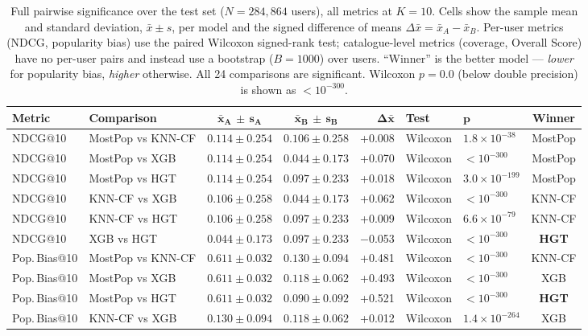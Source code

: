 \documentclass[10pt,twocolumn,letterpaper]{article}
\begin{document}
\begin{table}[h]
\centering\scriptsize
\caption{Full pairwise significance over the test set ($N{=}284{,}864$ users), all
metrics at $K{=}10$. Cells show the sample mean and standard deviation,
$\bar{x}\pm s$, per model and the signed difference of means
$\Delta\bar{x}{=}\bar{x}_A{-}\bar{x}_B$. Per-user metrics (NDCG, popularity bias) use the paired
Wilcoxon signed-rank test; catalogue-level metrics (coverage, Overall Score) have no
per-user pairs and instead use a bootstrap ($B{=}1000$) over users. ``Winner'' is
the better model --- \emph{lower} for popularity bias, \emph{higher} otherwise. All
24 comparisons are significant. Wilcoxon $p{=}0.0$ (below double precision) is shown
as $<\!10^{-300}$.}
\label{tab:significance}
\setlength{\tabcolsep}{4pt}
\renewcommand{\arraystretch}{1.12}
\begin{tabular}{llccrllc}
\toprule
\textbf{Metric} & \textbf{Comparison} & $\boldsymbol{\bar{x}_A\,{\pm}\,s_A}$ & $\boldsymbol{\bar{x}_B\,{\pm}\,s_B}$ & $\boldsymbol{\Delta\bar{x}}$ & \textbf{Test} & $\boldsymbol{p}$ & \textbf{Winner}\\
\midrule
NDCG@10 & MostPop vs KNN-CF & $0.114\pm0.254$ & $0.106\pm0.258$ & +0.008 & Wilcoxon & $1.8{\times}10^{-38}$ & MostPop\\
NDCG@10 & MostPop vs XGB & $0.114\pm0.254$ & $0.044\pm0.173$ & +0.070 & Wilcoxon & $<\!10^{-300}$ & MostPop\\
NDCG@10 & MostPop vs HGT & $0.114\pm0.254$ & $0.097\pm0.233$ & +0.018 & Wilcoxon & $3.0{\times}10^{-199}$ & MostPop\\
NDCG@10 & KNN-CF vs XGB & $0.106\pm0.258$ & $0.044\pm0.173$ & +0.062 & Wilcoxon & $<\!10^{-300}$ & KNN-CF\\
NDCG@10 & KNN-CF vs HGT & $0.106\pm0.258$ & $0.097\pm0.233$ & +0.009 & Wilcoxon & $6.6{\times}10^{-79}$ & KNN-CF\\
NDCG@10 & XGB vs HGT & $0.044\pm0.173$ & $0.097\pm0.233$ & $-$0.053 & Wilcoxon & $<\!10^{-300}$ & \textbf{HGT}\\
\midrule
Pop.\,Bias@10 & MostPop vs KNN-CF & $0.611\pm0.032$ & $0.130\pm0.094$ & +0.481 & Wilcoxon & $<\!10^{-300}$ & KNN-CF\\
Pop.\,Bias@10 & MostPop vs XGB & $0.611\pm0.032$ & $0.118\pm0.062$ & +0.493 & Wilcoxon & $<\!10^{-300}$ & XGB\\
Pop.\,Bias@10 & MostPop vs HGT & $0.611\pm0.032$ & $0.090\pm0.092$ & +0.521 & Wilcoxon & $<\!10^{-300}$ & \textbf{HGT}\\
Pop.\,Bias@10 & KNN-CF vs XGB & $0.130\pm0.094$ & $0.118\pm0.062$ & +0.012 & Wilcoxon & $1.4{\times}10^{-264}$ & XGB\\

\end{tabular}
\end{table}
\end{document}
